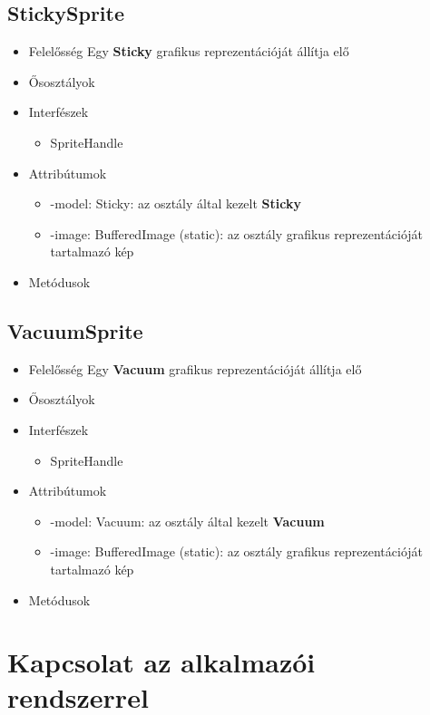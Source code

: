 \subsection{StickySprite}
\begin{itemize}
\item Felelősség \newline
    Egy \textbf{Sticky} grafikus reprezentációját állítja elő
\item Ősosztályok
\item Interfészek
    \begin{itemize}
        \item SpriteHandle
    \end{itemize}
\item Attribútumok
    \begin{itemize}
        \item -model: Sticky: az osztály által kezelt \textbf{Sticky}
        \item -image: BufferedImage (static): az osztály grafikus reprezentációját tartalmazó kép
    \end{itemize}
\item Metódusok
\end{itemize}

\subsection{VacuumSprite}
\begin{itemize}
\item Felelősség \newline
    Egy \textbf{Vacuum} grafikus reprezentációját állítja elő
\item Ősosztályok
\item Interfészek
    \begin{itemize}
        \item SpriteHandle
    \end{itemize}
\item Attribútumok
    \begin{itemize}
        \item -model: Vacuum: az osztály által kezelt \textbf{Vacuum}
        \item -image: BufferedImage (static): az osztály grafikus reprezentációját tartalmazó kép
    \end{itemize}
\item Metódusok
\end{itemize}

\section{Kapcsolat az alkalmazói rendszerrel}

